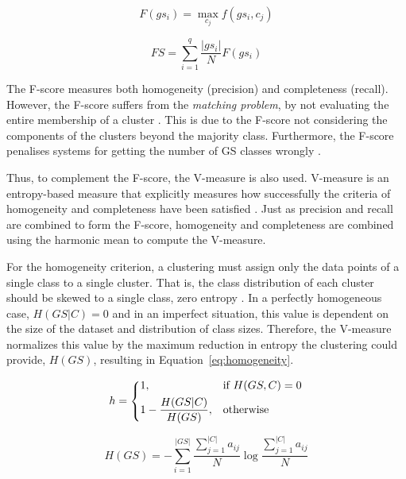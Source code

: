 \begin{equation} \label{eq:fscoregs}
 F(gs_i) = \underset{c_j}{\max} f(gs_i, c_j)
\end{equation}

\begin{equation} \label{eq:fscore}
 FS = \sum_{i=1}^q \frac{|gs_i|}{N}F(gs_i)
\end{equation}

The F-score measures both homogeneity (precision) and completeness (recall).
However, the F-score suffers from the \textit{matching problem}, by not
evaluating the entire membership of a cluster \cite{rosenberg2007v}. This is
due to the F-score not considering the components of the clusters beyond the
majority class. Furthermore, the F-score penalises systems for getting the
number of \ac{GS} classes wrongly \cite{manandhar2009semeval}.

Thus, to complement the F-score, the V-measure is also used. V-measure is an
entropy-based measure that explicitly measures how successfully the criteria
of homogeneity and completeness have been satisfied \cite{rosenberg2007v}. Just
as precision and recall are combined to form the F-score, homogeneity and
completeness are combined using the harmonic mean to compute the V-measure.

For the homogeneity criterion, a clustering must assign only the data points of a
single class to a single cluster. That is, the class distribution of each
cluster should be skewed to a single class, zero entropy \cite{rosenberg2007v}.
In a perfectly homogeneous case, $H(GS|C) = 0$ and in an imperfect situation,
this value is dependent on the size of the dataset and distribution of class
sizes. Therefore, the V-measure normalizes this value by the maximum reduction
in entropy the clustering could provide, $H(GS)$, resulting in
Equation~\ref{eq:homogeneity}.

\begin{equation} \label{eq:homogeneity}
 h = \begin{dcases}
      1,                        & \text{if } H(GS,C) = 0 \\
      1 - \frac{H(GS|C)}{H(GS)},& \text{otherwise} \\
     \end{dcases}
\end{equation}

\begin{equation}
 H(GS) = - \sum_{i=1}^{|GS|} \frac{\sum_{j=1}^{|C|} a_{ij}}{N}
         \log \frac{\sum_{j=1}^{|C|} a_{ij}}{N}
\end{equation}

